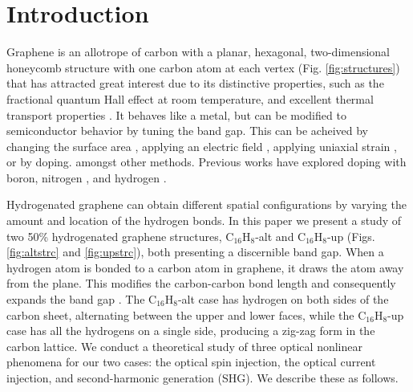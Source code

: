 \documentclass[pss]{wiley2sp} %
\begin{document}
\maketitle


\section{Introduction}\label{sec:intro}

Graphene is an allotrope of carbon with a planar, hexagonal, two-dimensional
honeycomb structure with one carbon atom at each vertex (Fig.
\ref{fig:structures}) that has attracted great interest due to its distinctive
properties, such as the fractional quantum Hall effect at room temperature,
and excellent thermal transport properties
\cite{geimNM07,geimNM07,reinaNL08,bottegoniAPL13,balandinNL08}. It behaves
like a metal, but can be modified to semiconductor behavior by tuning the band
gap. This can be acheived by changing the surface area \cite{hanPRL07},
applying an electric field \cite{zhangN09}, applying uniaxial strain
\cite{niACSN08}, or by doping. amongst other methods. Previous works have
explored doping with boron, nitrogen \cite{guoIJ11}, and hydrogen
\cite{eliasS09,guisingerNL09,samarakoonACSN10}.

Hydrogenated graphene can obtain different spatial configurations by varying
the amount and location of the hydrogen bonds. In this paper we present a
study of two 50\% hydrogenated graphene structures, C$_{16}$H$_{8}$-alt and
C$_{16}$H$_{8}$-up (Figs. \ref{fig:altstrc} and \ref{fig:upstrc}), both
presenting a discernible band gap. When a hydrogen atom is bonded to a carbon
atom in graphene, it draws the atom away from the plane. This modifies the
carbon-carbon bond length and consequently expands the band gap
\cite{samarakoonACSN10}. The C$_{16}$H$_{8}$-alt case has hydrogen on both
sides of the carbon sheet, alternating between the upper and lower faces,
while the C$_{16}$H$_{8}$-up case has all the hydrogens on a single side,
producing a zig-zag form in the carbon lattice. We conduct a theoretical study
of three optical nonlinear phenomena for our two cases: the optical spin
injection, the optical current injection, and second-harmonic generation
(SHG). We describe these as follows.
\end{document}
